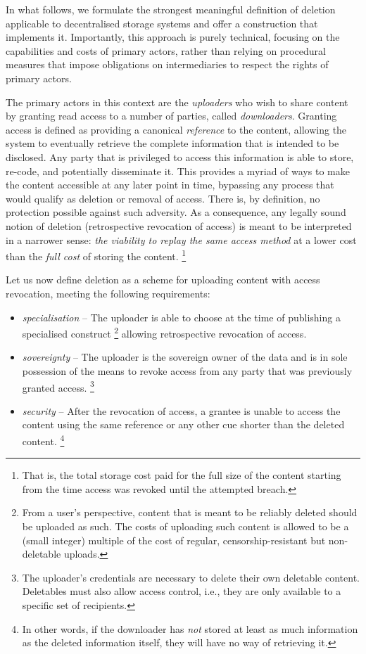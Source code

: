 In what follows, we formulate the strongest meaningful definition of deletion applicable to decentralised storage systems and offer a construction that implements it.
Importantly, this approach is purely technical, focusing on the capabilities and costs of primary actors, rather than relying on procedural measures that impose obligations on intermediaries to respect the rights of primary actors. 

The primary actors in this context are the \emph{uploaders} who wish to share content by granting read access to a number of parties, called \emph{downloaders}.  Granting access is defined as providing a canonical \emph{reference} to the content, allowing  the system to eventually retrieve the complete information that is intended to be disclosed. Any party that is privileged to access this information is able to store, re-code, and potentially disseminate it. This provides a myriad of ways to make the content accessible at any later point in time, bypassing any process that would qualify as deletion or removal of access. 
There is, by definition, no protection possible against such adversity. As a consequence, any legally sound notion of deletion (retrospective revocation of access) is meant to be interpreted in a narrower sense: \emph{the viability to replay the same access method}  at a lower cost than the \emph{full cost} of storing the content.%
%
\footnote{That is, the total storage cost paid for the full size of the content starting from the time access was revoked until the attempted breach.}

Let us now define deletion as a scheme for uploading content with access revocation, meeting the following requirements: 

\begin{itemize}
    \item \emph{specialisation} -- The uploader is able to choose at the time of publishing a specialised construct%
%
\footnote{From a user's perspective, content that is meant to be reliably deleted should be uploaded as such. The costs of uploading such content is allowed to be a (small integer) multiple of the cost of regular, censorship-resistant but non-deletable uploads.}
%
    allowing retrospective revocation of access.
    \item \emph{sovereignty} -- The uploader is the sovereign owner of the data and is in sole possession of the means to revoke access from any party that was previously granted access.%
%
\footnote{The uploader's credentials are necessary to delete their own deletable content. Deletables must also allow access control, i.e., they are only available to a specific set of recipients.}
%
    \item \emph{security} -- After the revocation of access, a grantee is unable to access the content using the same reference or any other cue shorter than the deleted content.%
%
\footnote{In other words, if the downloader has \emph{not} stored at least as much information as the deleted information itself, they will have no way of retrieving it.}
%
\end{itemize}

